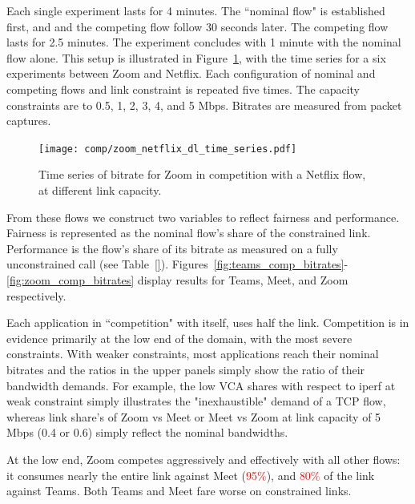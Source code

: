 Each single experiment lasts for 4 minutes.
The ``nominal flow" is established first, and
  and the competing flow follow 30 seconds later.
The competing flow lasts for 2.5 minutes.
The experiment concludes with 1 minute
  with the nominal flow alone.
This setup is illustrated in Figure~\ref{fig:ts_zoom_netflix},
  with the time series for a six experiments between Zoom and Netflix.
Each configuration of nominal and competing flows and link constraint
  is repeated five times.
The capacity constraints are to 0.5, 1, 2, 3, 4, and 5 Mbps.
Bitrates are measured from packet captures.
  
\begin{figure}[]
    \texttt{[image: comp/zoom\_netflix\_dl\_time\_series.pdf]}
    \caption{Time series of bitrate for Zoom in competition with a Netflix flow, at different link capacity. }
	\label{fig:ts_zoom_netflix}
\end{figure}

From these flows we construct two variables
  to reflect fairness and performance.
Fairness is represented 
  as the nominal flow's share of the constrained link.
Performance is the flow's share of its bitrate 
 as measured on a fully unconstrained call (see Table~\ref{}).
Figures~\ref{fig:teams_comp_bitrates}-\ref{fig:zoom_comp_bitrates}
  display results for Teams, Meet, and Zoom respectively.

Each application in ``competition" with itself, uses half the link.
Competition is in evidence primarily at the low end of the domain,
  with the most severe constraints.
With weaker constraints, most applications reach their nominal bitrates
  and the ratios in the upper panels simply show the ratio of their bandwidth demands.
For example, 
  the low VCA shares with respect to iperf at weak constraint
  simply illustrates the "inexhaustible" demand of a TCP flow,
  whereas link share's of Zoom vs Meet or Meet vs Zoom 
  at link capacity of 5 Mbps (0.4 or 0.6) simply 
  reflect the nominal bandwidths.

  
At the low end, Zoom competes
  aggressively and effectively with all other flows:
  it consumes nearly the entire link against Meet (\textcolor{red}{95\%}), 
  and \textcolor{red}{80\%} of the link against Teams.
Both Teams and Meet fare worse on constrained links.
  
